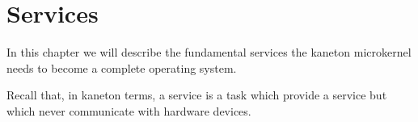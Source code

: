 
%
%

\chapter{Services}

In this chapter we will describe the fundamental services the kaneton
microkernel needs to become a complete operating system.

\newpage

%
%

Recall that, in kaneton terms, a service is a task which provide a
service but which never communicate with hardware devices.

